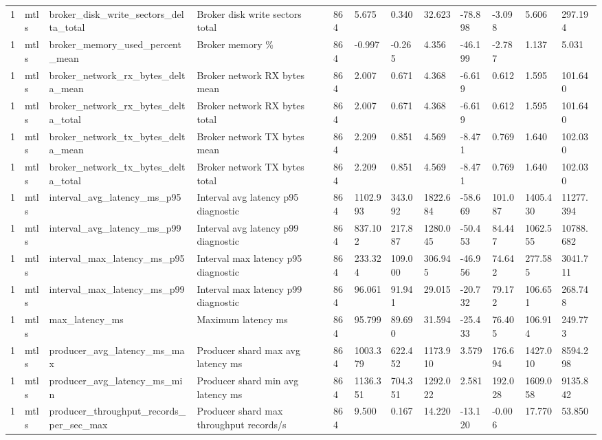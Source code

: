 \begin{longtable}{llllllllllll}
1 & mtls & broker\_disk\_write\_sectors\_delta\_total & Broker disk write sectors total & 864 & 5.675 & 0.340 & 32.623 & -78.898 & -3.098 & 5.606 & 297.194 \\
1 & mtls & broker\_memory\_used\_percent\_mean & Broker memory \% & 864 & -0.997 & -0.265 & 4.356 & -46.199 & -2.787 & 1.137 & 5.031 \\
1 & mtls & broker\_network\_rx\_bytes\_delta\_mean & Broker network RX bytes mean & 864 & 2.007 & 0.671 & 4.368 & -6.619 & 0.612 & 1.595 & 101.640 \\
1 & mtls & broker\_network\_rx\_bytes\_delta\_total & Broker network RX bytes total & 864 & 2.007 & 0.671 & 4.368 & -6.619 & 0.612 & 1.595 & 101.640 \\
1 & mtls & broker\_network\_tx\_bytes\_delta\_mean & Broker network TX bytes mean & 864 & 2.209 & 0.851 & 4.569 & -8.471 & 0.769 & 1.640 & 102.030 \\
1 & mtls & broker\_network\_tx\_bytes\_delta\_total & Broker network TX bytes total & 864 & 2.209 & 0.851 & 4.569 & -8.471 & 0.769 & 1.640 & 102.030 \\
1 & mtls & interval\_avg\_latency\_ms\_p95 & Interval avg latency p95 diagnostic & 864 & 1102.993 & 343.092 & 1822.684 & -58.669 & 101.087 & 1405.430 & 11277.394 \\
1 & mtls & interval\_avg\_latency\_ms\_p99 & Interval avg latency p99 diagnostic & 864 & 837.102 & 217.887 & 1280.045 & -50.453 & 84.447 & 1062.555 & 10788.682 \\
1 & mtls & interval\_max\_latency\_ms\_p95 & Interval max latency p95 diagnostic & 864 & 233.324 & 109.000 & 306.945 & -46.956 & 74.642 & 277.585 & 3041.711 \\
1 & mtls & interval\_max\_latency\_ms\_p99 & Interval max latency p99 diagnostic & 864 & 96.061 & 91.941 & 29.015 & -20.732 & 79.172 & 106.651 & 268.748 \\
1 & mtls & max\_latency\_ms & Maximum latency ms & 864 & 95.799 & 89.690 & 31.594 & -25.433 & 76.405 & 106.914 & 249.773 \\
1 & mtls & producer\_avg\_latency\_ms\_max & Producer shard max avg latency ms & 864 & 1003.379 & 622.452 & 1173.910 & 3.579 & 176.694 & 1427.010 & 8594.298 \\
1 & mtls & producer\_avg\_latency\_ms\_min & Producer shard min avg latency ms & 864 & 1136.351 & 704.351 & 1292.022 & 2.581 & 192.028 & 1609.058 & 9135.842 \\
1 & mtls & producer\_throughput\_records\_per\_sec\_max & Producer shard max throughput records/s & 864 & 9.500 & 0.167 & 14.220 & -13.120 & -0.006 & 17.770 & 53.850 \\

\end{longtable}
